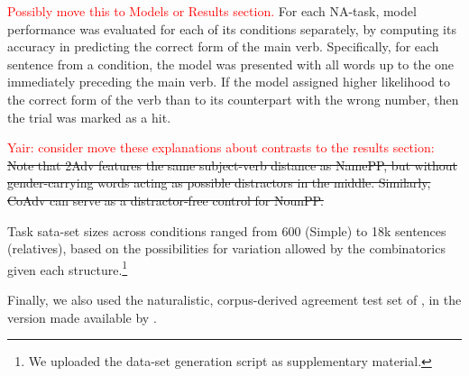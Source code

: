 \textcolor{red}{Possibly move this to Models or Results section.} For
each NA-task, model performance was evaluated for each of its
conditions separately, by computing its accuracy in predicting the
correct form of the main verb. Specifically, for each sentence from a
condition, the model was presented with all words up to the one
immediately preceding the main verb. If the model assigned higher
likelihood to the correct form of the verb than to its counterpart
with the wrong number, then the trial was marked as a hit.

\textcolor{red}{Yair: consider move these explanations about contrasts to the results section:} \sout{Note that 2Adv features the same subject-verb
distance as NamePP, but without gender-carrying words acting as
possible distractors in the middle. Similarly, CoAdv can serve as a
distractor-free control for NounPP.}

Task sata-set sizes across conditions ranged from 600 (Simple) to 18k sentences (relatives),
based on the possibilities for variation allowed by the combinatorics
given each structure.\footnote{We uploaded the data-set generation
  script as supplementary material.}

Finally, we also used the naturalistic, corpus-derived agreement test set of , in the version made available by .






